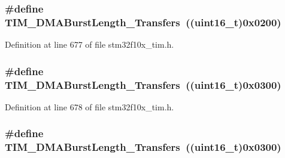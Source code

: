 \subsubsection[{\texorpdfstring{T\+I\+M\+\_\+\+D\+M\+A\+Burst\+Length\+\_\+3\+Transfers}{TIM_DMABurstLength_3Transfers}}]{\setlength{\rightskip}{0pt plus 5cm}\#define T\+I\+M\+\_\+\+D\+M\+A\+Burst\+Length\+\_\+Transfers~(({\bf uint16\+\_\+t})0x0200)}\hypertarget{group___t_i_m___d_m_a___burst___length_ga3a99863a0925e0cc9a11b91aade66f11}{}\label{group___t_i_m___d_m_a___burst___length_ga3a99863a0925e0cc9a11b91aade66f11}


Definition at line 677 of file stm32f10x\+\_\+tim.\+h.

\subsubsection[{\texorpdfstring{T\+I\+M\+\_\+\+D\+M\+A\+Burst\+Length\+\_\+4\+Transfers}{TIM_DMABurstLength_4Transfers}}]{\setlength{\rightskip}{0pt plus 5cm}\#define T\+I\+M\+\_\+\+D\+M\+A\+Burst\+Length\+\_\+Transfers~(({\bf uint16\+\_\+t})0x0300)}\hypertarget{group___t_i_m___d_m_a___burst___length_ga84bfeb309593a1ac580e233bf7514b36}{}\label{group___t_i_m___d_m_a___burst___length_ga84bfeb309593a1ac580e233bf7514b36}


Definition at line 678 of file stm32f10x\+\_\+tim.\+h.

\subsubsection[{\texorpdfstring{T\+I\+M\+\_\+\+D\+M\+A\+Burst\+Length\+\_\+4\+Transfers}{TIM_DMABurstLength_4Transfers}}]{\setlength{\rightskip}{0pt plus 5cm}\#define T\+I\+M\+\_\+\+D\+M\+A\+Burst\+Length\+\_\+Transfers~(({\bf uint16\+\_\+t})0x0300)}\hypertarget{group___t_i_m___d_m_a___burst___length_ga84bfeb309593a1ac580e233bf7514b36}{}\label{group___t_i_m___d_m_a___burst___length_ga84bfeb309593a1ac580e233bf7514b36}


